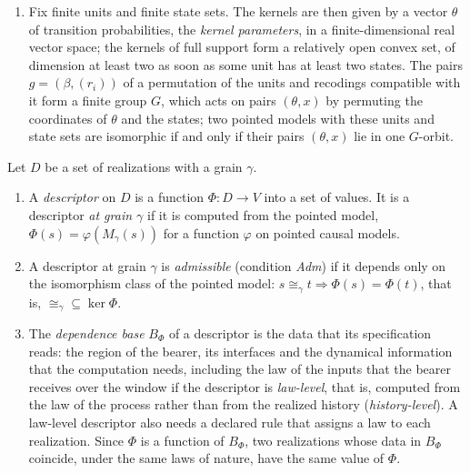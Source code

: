 \begin{definition}
\begin{enumerate}
\item[(e)] Fix finite units and finite state sets. The kernels are then given by a vector $\theta$ of transition probabilities, the \emph{kernel parameters}, in a finite-dimensional real vector space; the kernels of full support form a relatively open convex set, of dimension at least two as soon as some unit has at least two states. The pairs $g=(\beta,(r_i))$ of a permutation of the units and recodings compatible with it form a finite group $G$, which acts on pairs $(\theta,x)$ by permuting the coordinates of $\theta$ and the states; two pointed models with these units and state sets are isomorphic if and only if their pairs $(\theta,x)$ lie in one $G$-orbit.
\end{enumerate}
\end{definition}

\begin{definition}\label{def:adm}
Let $D$ be a set of realizations with a grain $\gamma$.
\begin{enumerate}
\item[(a)] A \emph{descriptor} on $D$ is a function $\Phi:D\to V$ into a set of values. It is a descriptor \emph{at grain $\gamma$} if it is computed from the pointed model, $\Phi(s)=\varphi(M_\gamma(s))$ for a function $\varphi$ on pointed causal models.
\item[(b)] A descriptor at grain $\gamma$ is \emph{admissible} (condition \emph{Adm}) if it depends only on the isomorphism class of the pointed model: $s\cong_\gamma t\Rightarrow\Phi(s)=\Phi(t)$, that is, ${\cong_\gamma}\subseteq\ker\Phi$.
\item[(c)] The \emph{dependence base} $B_\Phi$ of a descriptor is the data that its specification reads: the region of the bearer, its interfaces and the dynamical information that the computation needs, including the law of the inputs that the bearer receives over the window if the descriptor is \emph{law-level}, that is, computed from the law of the process rather than from the realized history (\emph{history-level}). A law-level descriptor also needs a declared rule that assigns a law to each realization. Since $\Phi$ is a function of $B_\Phi$, two realizations whose data in $B_\Phi$ coincide, under the same laws of nature, have the same value of $\Phi$.
\end{enumerate}
\end{definition}

